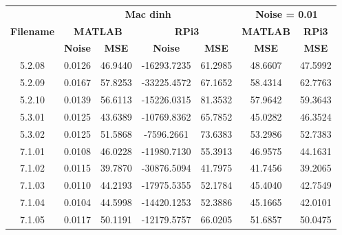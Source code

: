 \begin{table}[H]
\centering
\begin{tabular}{|c|cccc|cc|}
\hline
\multirow{3}{*}{\textbf{Filename}} & \multicolumn{4}{c|}{\textbf{Mac dinh}} & \multicolumn{2}{c|}{\textbf{Noise = 0.01}} \\ \cline{2-7} 
 & \multicolumn{2}{c|}{\textbf{MATLAB}} & \multicolumn{2}{c|}{\textbf{RPi3}} & \multicolumn{1}{c|}{\textbf{MATLAB}} & \textbf{RPi3} \\ \cline{2-7} 
 & \multicolumn{1}{c|}{\textbf{Noise}} & \multicolumn{1}{c|}{\textbf{MSE}} & \multicolumn{1}{c|}{\textbf{Noise}} & \textbf{MSE} & \multicolumn{1}{c|}{\textbf{MSE}} & \textbf{MSE} \\ \hline
5.2.08 & \multicolumn{1}{c|}{0.0126} & \multicolumn{1}{c|}{46.9440} & \multicolumn{1}{c|}{-16293.7235} & 61.2985 & \multicolumn{1}{c|}{48.6607} & 47.5992 \\ \hline
5.2.09 & \multicolumn{1}{c|}{0.0167} & \multicolumn{1}{c|}{57.8253} & \multicolumn{1}{c|}{-33225.4572} & 67.1652 & \multicolumn{1}{c|}{58.4314} & 62.7763 \\ \hline
5.2.10 & \multicolumn{1}{c|}{0.0139} & \multicolumn{1}{c|}{56.6113} & \multicolumn{1}{c|}{-15226.0315} & 81.3532 & \multicolumn{1}{c|}{57.9642} & 59.3643 \\ \hline
5.3.01 & \multicolumn{1}{c|}{0.0125} & \multicolumn{1}{c|}{43.6389} & \multicolumn{1}{c|}{-10769.8362} & 65.7852 & \multicolumn{1}{c|}{45.0282} & 46.3524 \\ \hline
5.3.02 & \multicolumn{1}{c|}{0.0125} & \multicolumn{1}{c|}{51.5868} & \multicolumn{1}{c|}{-7596.2661} & 73.6383 & \multicolumn{1}{c|}{53.2986} & 52.7383 \\ \hline
7.1.01 & \multicolumn{1}{c|}{0.0108} & \multicolumn{1}{c|}{46.0228} & \multicolumn{1}{c|}{-11980.7130} & 55.3913 & \multicolumn{1}{c|}{46.9575} & 44.1631 \\ \hline
7.1.02 & \multicolumn{1}{c|}{0.0115} & \multicolumn{1}{c|}{39.7870} & \multicolumn{1}{c|}{-30876.5094} & 41.7975 & \multicolumn{1}{c|}{41.7456} & 39.2065 \\ \hline
7.1.03 & \multicolumn{1}{c|}{0.0110} & \multicolumn{1}{c|}{44.2193} & \multicolumn{1}{c|}{-17975.5355} & 52.1784 & \multicolumn{1}{c|}{45.4040} & 42.7549 \\ \hline
7.1.04 & \multicolumn{1}{c|}{0.0104} & \multicolumn{1}{c|}{44.5998} & \multicolumn{1}{c|}{-14420.1253} & 52.3886 & \multicolumn{1}{c|}{45.1665} & 42.0101 \\ \hline
7.1.05 & \multicolumn{1}{c|}{0.0117} & \multicolumn{1}{c|}{50.1191} & \multicolumn{1}{c|}{-12179.5757} & 66.0205 & \multicolumn{1}{c|}{51.6857} & 50.0475 \\ \hline

\end{tabular}
\end{table}
